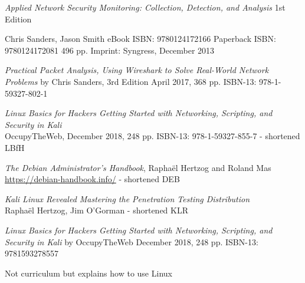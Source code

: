 \documentclass[Screen16to9,17pt]{foils}
\begin{document}


\emph{Applied Network Security Monitoring: Collection, Detection, and Analysis}
1st Edition

Chris Sanders, Jason Smith
eBook ISBN: 9780124172166
Paperback ISBN: 9780124172081 496 pp.
Imprint: Syngress, December 2013

{\footnotesize{}}


\emph{Practical Packet Analysis,
Using Wireshark to Solve Real-World Network Problems}
by Chris Sanders, 3rd Edition
April 2017, 368 pp.
ISBN-13:
978-1-59327-802-1




\begin{list2}
\item \emph{Linux Basics for Hackers Getting Started with Networking, Scripting, and Security in Kali}\\
OccupyTheWeb, December 2018, 248 pp. ISBN-13: 978-1-59327-855-7 - shortened LBfH
\item \emph{The Debian Administrator’s Handbook}, Raphaël Hertzog and Roland Mas\\
\url{https://debian-handbook.info/} - shortened DEB
\item \emph{Kali Linux Revealed  Mastering the Penetration Testing Distribution}\\
Raphaël Hertzog, Jim O'Gorman - shortened KLR
\end{list2}





\emph{Linux Basics for Hackers
Getting Started with Networking, Scripting, and Security in Kali}
by OccupyTheWeb
December 2018, 248 pp.
ISBN-13:
9781593278557

Not curriculum but explains how to use Linux

\end{document}
